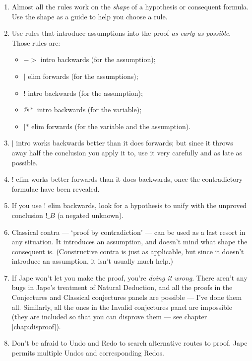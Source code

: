 \documentclass[11pt]{book}
\newcommand{\chapref}[1]{chapter \ref{chap:#1}}
\begin{document}
\begin{enumerate}
\item Almost all the rules work on the \emph{shape} of a hypothesis 
or consequent formula. Use the shape as a guide to help you choose 
a rule.

\item Use rules that introduce assumptions into the proof \emph{as 
early as possible}. Those rules are: 
\begin{itemize}
\item $->$ intro backwards (for the assumption);
\item $|$ elim forwards (for the assumptions);
\item $!$ intro backwards (for the assumption);
\item $@*$ intro backwards (for the variable);
\item $|*$ elim forwards (for the variable and the assumption).
\end{itemize}


\item $|$ intro works backwards better than it does forwards; but 
since it throws away half the conclusion you apply it to, use 
it very carefully and as late as possible.

\item $!$ elim works better forwards than it does backwards, 
once the contradictory formulae have been revealed.

\item If you use $!$ elim backwards, look for a hypothesis 
to unify with the unproved conclusion $!\_B$ (a negated 
unknown).

\item Classical contra --- `proof by contradiction' --- can be used as 
a last resort in any situation. It introduces an assumption, 
and doesn't mind what shape the consequent is. (Constructive 
contra is just as applicable, but since it doesn't introduce 
an assumption, it isn't usually much help.)

\item If Jape won't let you make the proof, you're \emph{doing it wrong}. 
There aren't any bugs in Jape's treatment of Natural Deduction, 
and all the proofs in the Conjectures and Classical conjectures 
panels are possible --- I've done them all. Similarly, all the 
ones in the Invalid conjectures panel are impossible (they are 
included so that you can disprove them --- see \chapref{disproof}).

\item Don't be afraid to Undo and Redo to search alternative routes to proof. Jape permits multiple Undos and corresponding Redos.

\end{enumerate}
\end{document}
